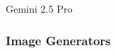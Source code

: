 \begin{frame}{Gemini 2.5 Pro}
    
    \begin{figure}
       \centering
    \end{figure}

\end{frame}

\begin{frame}
    \frametitle{Image Generators}
    
    \begin{figure}
       \centering
    \end{figure}

\end{frame}


